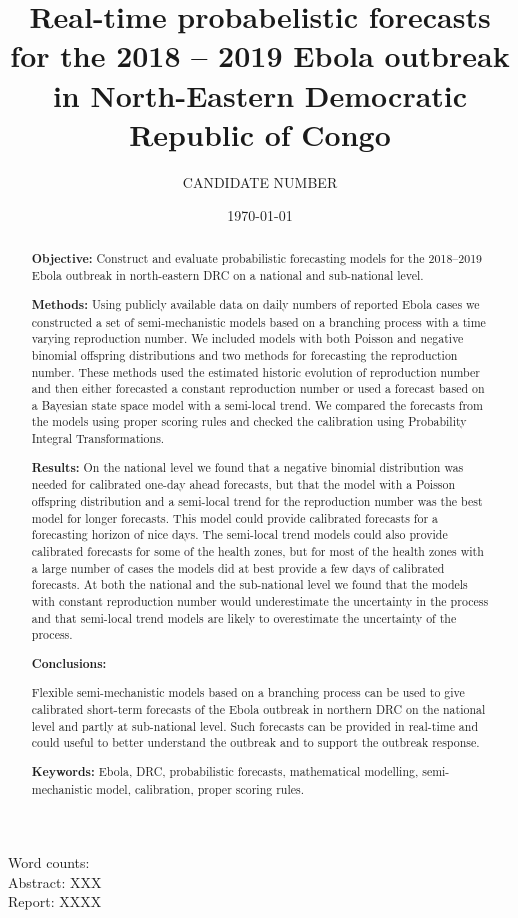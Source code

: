 \documentclass[12pt]{article}
\title{Real-time probabelistic forecasts for the 2018 -- 2019 Ebola outbreak in North-Eastern Democratic Republic of Congo}
\author{
  CANDIDATE NUMBER
}
\date{\today}
\begin{document}
\maketitle


Word counts:\\
Abstract: XXX\\
Report: XXXX

\begin{abstract}
  {\bf Objective:} Construct and evaluate probabilistic forecasting models for the 2018--2019 Ebola outbreak in north-eastern DRC on a national and sub-national level.
  
  \medskip
  
  {\bf Methods:} Using publicly available data on daily numbers of reported Ebola cases we constructed a set of semi-mechanistic models based on a branching process with a time varying reproduction number. We included models with both Poisson and negative binomial offspring distributions and two methods for forecasting the reproduction number. These methods used the estimated historic evolution of reproduction number and then either forecasted a constant reproduction number or used a forecast based on a Bayesian state space model with a semi-local trend. We compared the forecasts from the models using proper scoring rules and checked the calibration using Probability Integral Transformations. 

  \medskip
  
  {\bf Results:} On the national level we found that a negative binomial distribution was needed for calibrated one-day ahead forecasts, but that the model with a Poisson offspring distribution and a semi-local trend for the reproduction number was the best model for longer forecasts. This model could provide calibrated forecasts for a forecasting horizon of nice days. The semi-local trend models could also provide calibrated forecasts for some of the health zones, but for most of the health zones with a large number of cases the models did at best provide a few days of calibrated forecasts. At both the national and the sub-national level we found that the models with constant reproduction number would underestimate the uncertainty in the process and that semi-local trend models are likely to overestimate the uncertainty of the process. 

  \medskip
  
  {\bf Conclusions:}

  Flexible semi-mechanistic models based on a branching process can be used to give calibrated short-term forecasts of the Ebola outbreak in northern DRC on the national level and partly at sub-national level. Such forecasts can be provided in real-time and could useful to better understand the outbreak and to support the outbreak response. 

  \medskip

  {\bf Keywords:} Ebola, DRC, probabilistic forecasts, mathematical modelling, semi-mechanistic model, calibration, proper scoring rules.

\end{abstract}
\end{document}
